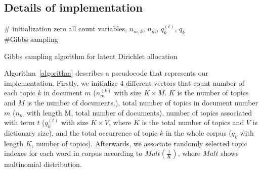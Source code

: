 \documentclass[twoside,12pt]{article}
\begin{document}
\subsection{Details of implementation}
\begin{algorithm}[h!]
\# initialization\;
 zero all count variables, $n_{m,k}$, $n_m$, $q_k^{(t)}$, $q_k$ \\
\#Gibbs sampling\;

\caption{Gibbs sampling algorithm for latent Dirichlet allocation}
\label{algorithm}
\end{algorithm}

Algorithm~\ref{algorithm} describes a pseudocode that represents our implementation. Firstly, we initialize 4 different vectors that count number of each topic $k$ in document $m$ ($n_m^{(k)}$ with size $K\times M$. $K$ is the number of topics and $M$ is the number of documents.), total number of topics in document number $m$ ($n_m$ with length M, total number of documents), number of topics associated with term $t$ ($q_k^{(t)}$ with size $K\times V$, where $K$ is the total number of topics and $V$ is dictionary size), and the total occurrence of topic $k$ in the whole corpus ($q_k$ with length $K$, number of topics). Afterwards, we associate randomly selected topic indexes for each word in corpus according to $Mult(\frac{1}{K})$, where $Mult$ shows multinomial distribution. 
\end{document}
